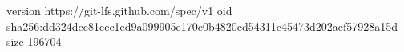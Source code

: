 version https://git-lfs.github.com/spec/v1
oid sha256:dd324dcc81eec1ed9a099905e170c0b4820cd54311c45473d202aef57928a15d
size 196704
